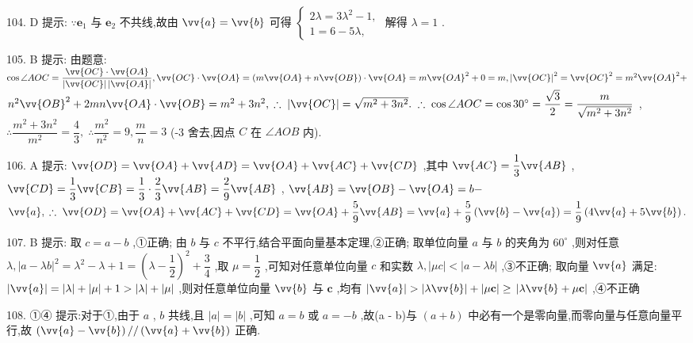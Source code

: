 104. D 提示: $\because {\mathbf{e}}_{1}$ 与 ${\mathbf{e}}_{2}$ 不共线,故由 $\vv{a} = \vv{b}$ 可得 $\left\{  \begin{array}{l} {2\lambda } = 3{\lambda }^{2} - 1, \\  1 = 6 - {5\lambda }, \end{array}\right.$ 解得 $\lambda  = 1$ .

105. B 提示: 由题意: $\cos \angle {AOC} = \dfrac{\vv{OC} \cdot  \vv{OA}}{\left| \vv{OC}\right| \left| \vv{OA}\right| },\vv{OC} \cdot  \vv{OA} = \left( {m\vv{OA} + n\vv{OB}}\right)  \cdot  \vv{OA} = m{\vv{OA}}^{2} + 0 = m,{\left| \vv{OC}\right| }^{2} = {\vv{OC}}^{2} = {m}^{2}{\vv{OA}}^{2} +$  ${n}^{2}{\vv{OB}}^{2} + {2mn}\vv{OA} \cdot  \vv{OB} = {m}^{2} + 3{n}^{2},\;\therefore \;\left| \vv{OC}\right|  = \sqrt{{m}^{2} + 3{n}^{2}}.\;\therefore \;\cos \angle {AOC} = \cos {30}^{ \circ  } = \dfrac{\sqrt{3}}{2} = \dfrac{m}{\sqrt{{m}^{2} + 3{n}^{2}}}$ , $\therefore \dfrac{{m}^{2} + 3{n}^{2}}{{m}^{2}} = \dfrac{4}{3},\;\therefore \dfrac{{m}^{2}}{{n}^{2}} = 9,\dfrac{m}{n} = 3$ (-3 舍去,因点 $C$ 在 $\angle {AOB}$ 内).

106. A 提示: $\vv{OD} = \vv{OA} + \vv{AD} = \vv{OA} + \vv{AC} + \vv{CD}$ ,其中 $\vv{AC} = \dfrac{1}{3}\vv{AB}$ , $\vv{CD} = \dfrac{1}{3}\vv{CB} = \dfrac{1}{3} \cdot  \dfrac{2}{3}\vv{AB} = \dfrac{2}{9}\vv{AB}$ , $\vv{AB} = \vv{OB} - \vv{OA} = b -$  $\vv{a},\;\therefore \;\vv{OD} = \vv{OA} + \vv{AC} + \vv{CD} = \vv{OA} + \dfrac{5}{9}\vv{AB} = \vv{a} + \dfrac{5}{9}\left( {\vv{b} - \vv{a}}\right)  = \dfrac{1}{9}\left( {4\vv{a} + 5\vv{b}}\right) .$

107. B 提示: 取 $c = a - b$ ,①正确; 由 $b$ 与 $c$ 不平行,结合平面向量基本定理,②正确; 取单位向量 $a$ 与 $b$ 的夹角为 ${60}^{ \circ  }$ ,则对任意 $\lambda ,{\left| a - \lambda b\right| }^{2} = {\lambda }^{2} - \lambda  + 1 = {\left( \lambda  - \dfrac{1}{2}\right) }^{2} + \dfrac{3}{4}$ ,取 $\mu  = \dfrac{1}{2}$ ,可知对任意单位向量 $c$ 和实数 $\lambda ,\left| {\mu c}\right|  < \left| {a - {\lambda b}}\right|$ ,③不正确; 取向量 $\vv{a}$ 满足: $\left| \vv{a}\right|  = \left| \lambda \right|  + \left| \mu \right|  + 1 > \left| \lambda \right|  + \left| \mu \right|$ ,则对任意单位向量 $\vv{b}$ 与 $\mathbf{c}$ ,均有 $\left| \vv{a}\right|  > \left| {\lambda \vv{b}}\right|  + \left| {\mu \mathbf{c}}\right|  \geq$  $\left| {\lambda \vv{b} + \mu \mathbf{c}}\right|$ ,④不正确

108. ①④ 提示:对于①,由于 $a$ , $b$ 共线,且 $\left| a\right|  = \left| b\right|$ ,可知 $a = b$ 或 $a =  - b$ ,故(a - b)与 $\left( {a + b}\right)$ 中必有一个是零向量,而零向量与任意向量平行,故 $\left( {\vv{a} - \vv{b}}\right) //\left( {\vv{a} + \vv{b}}\right)$ 正确.

